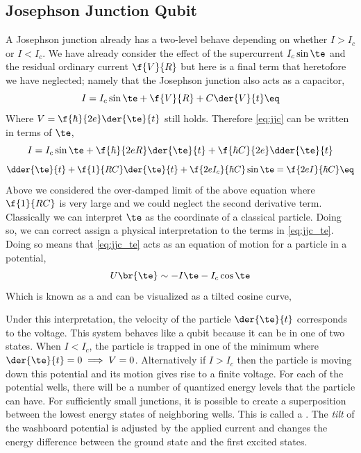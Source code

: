\documentclass{article}
\begin{document}
\subsection{Josephson Junction Qubit}
A Josephson junction already has a two-level behave depending on whether $I > I_c$ or $I < I_c$. We have already consider the effect of the supercurrent $I_c \sin \te$ and the residual ordinary current $\f{V}{R}$ but here is a final term that heretofore we have neglected; namely that the Josephson junction also acts as a capacitor,
\[ I = I_c \sin \te + \f{V}{R} + C \der{V}{t} \eq \label{eq:jjc}\]
Where $V = \f{\hbar}{2e} \der{\te}{t}$ still holds. Therefore \cref{eq:jjc} can be written in terms of $\te$,
\[ I = I_c \sin \te + \f{\hbar}{2eR}\der{\te}{t} + \f{\hbar C}{2e} \dder{\te}{t} \]
\[ \dder{\te}{t} + \f{1}{RC} \der{\te}{t} + \f{2eI_c}{\hbar C} \sin \te = \f{2eI}{\hbar C} \eq \label{eq:jjc_te}\]
Above we considered the over-damped limit of the above equation where $\f{1}{RC}$ is very large and we could neglect the second derivative term. Classically we can interpret $\te$ as the coordinate of a classical particle. Doing so, we can correct assign a physical interpretation to the terms in \cref{eq:jjc_te}. Doing so means that \cref{eq:jjc_te} acts as an equation of motion for a particle in a potential,
\[ U\br{\te} \sim - I \te - I_c \cos \te \]
Which is known as a  and can be visualized as a tilted cosine curve,
\begin{center}
\end{center}
Under this interpretation, the velocity of the particle $\der{\te}{t}$ corresponds to the voltage. This system behaves like a qubit because it can be in one of two states. When $I < I_c$, the particle is trapped in one of the minimum where $\der{\te}{t} = 0 \implies V = 0$. Alternatively if $I > I_c$ then the particle is moving down this potential and its motion gives rise to a finite voltage. For each of the potential wells, there will be a number of quantized energy levels that the particle can have. For sufficiently small junctions, it is possible to create a superposition between the lowest energy states of neighboring wells. This is called a . The \textit{tilt} of the washboard potential is adjusted by the applied current and changes the energy difference between the ground state and the first excited states.\\
\end{document}
